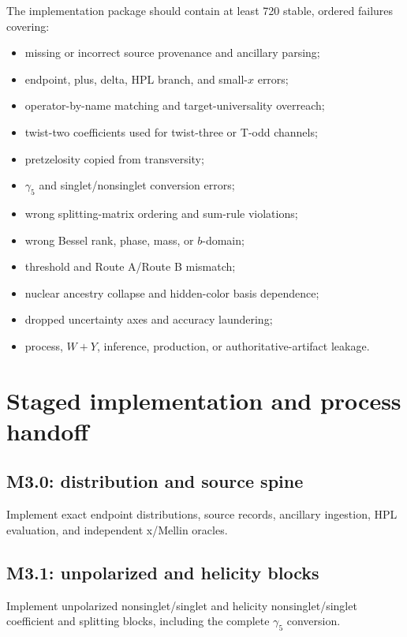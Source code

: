 \documentclass[11pt]{article}
\begin{document}
The implementation package should contain at least 720 stable, ordered failures covering:
\begin{itemize}
\item missing or incorrect source provenance and ancillary parsing;
\item endpoint, plus, delta, HPL branch, and small-\(x\) errors;
\item operator-by-name matching and target-universality overreach;
\item twist-two coefficients used for twist-three or T-odd channels;
\item pretzelosity copied from transversity;
\item \(\gamma_5\) and singlet/nonsinglet conversion errors;
\item wrong splitting-matrix ordering and sum-rule violations;
\item wrong Bessel rank, phase, mass, or \(b\)-domain;
\item threshold and Route A/Route B mismatch;
\item nuclear ancestry collapse and hidden-color basis dependence;
\item dropped uncertainty axes and accuracy laundering;
\item process, \(W+Y\), inference, production, or authoritative-artifact leakage.
\end{itemize}

\section{Staged implementation and process handoff}
\label{sec:stages}

\subsection{M3.0: distribution and source spine}

Implement exact endpoint distributions, source records, ancillary ingestion, HPL evaluation, and independent x/Mellin oracles.

\subsection{M3.1: unpolarized and helicity blocks}

Implement unpolarized nonsinglet/singlet and helicity nonsinglet/singlet coefficient and splitting blocks, including the complete \(\gamma_5\) conversion.
\end{document}
